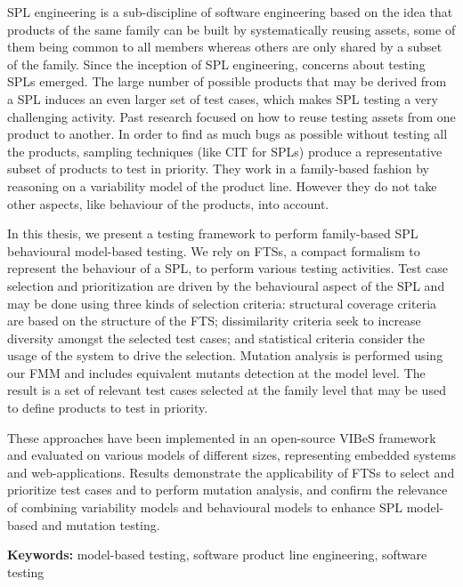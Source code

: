 \acrfull{SPL} engineering is a sub-discipline of software engineering based on the idea that products of the same family can be built by systematically reusing assets, some of them being common to all members whereas others are only shared by a subset of the family.
%
Since the inception of SPL engineering, concerns about testing SPLs emerged. The large number of possible products that may be derived from a SPL induces an even larger set of test cases, which makes SPL testing a very challenging activity. Past research focused on how to reuse testing assets from one product to another. 
%
In order to find as much bugs as possible without testing all the products, sampling techniques (like \acrfull{CIT} for SPLs) produce a representative subset of products to test in priority. They work in a family-based fashion by reasoning on a variability model of the product line. However they do not take other aspects, like behaviour of the products, into account.

In this thesis, we present a testing framework to perform family-based SPL behavioural model-based testing. We rely on \glspl{FTS}, a compact formalism to represent the behaviour of a SPL, to perform various testing activities. Test case selection and prioritization are driven by the behavioural aspect of the SPL and may be done using three kinds of selection criteria: structural coverage criteria are based on the structure of the FTS; dissimilarity criteria seek to increase diversity amongst the selected test cases; and statistical criteria consider the usage of the system to drive the selection. Mutation analysis is performed using our \acrfull{FMM} and includes equivalent mutants detection at the model level. The result is a set of relevant test cases selected at the family level that may be used to define  products to test in priority.

These approaches have been implemented in an open-source \acrfull{VIBeS} framework and evaluated on various models of different sizes, representing embedded systems and web-applications. Results demonstrate the applicability of FTSs to select and prioritize test cases and to perform mutation analysis, and confirm the relevance of combining variability models and behavioural models to enhance SPL model-based and mutation testing.

\textbf{Keywords:} model-based testing, software product line engineering, software testing


